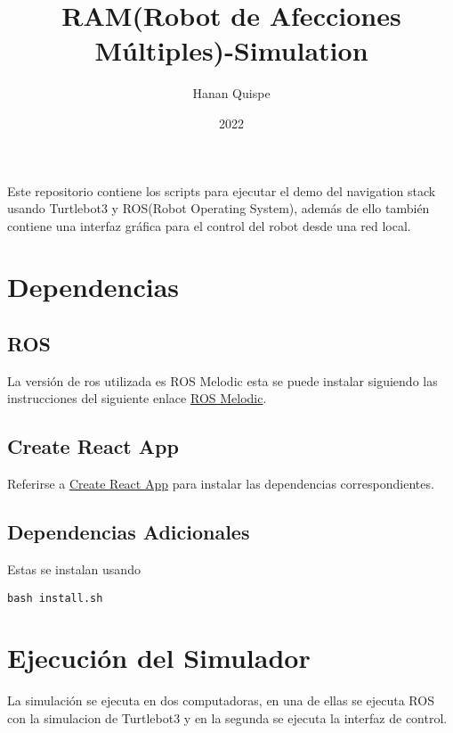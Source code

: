 \documentclass[11pt]{article}
\author{Hanan Quispe}
\date{2022}
\title{RAM(Robot de Afecciones Múltiples)-Simulation}
\begin{document}
\maketitle
Este repositorio contiene los scripts para ejecutar el demo del navigation stack usando Turtlebot3 y ROS(Robot Operating System), además de ello también contiene una interfaz gráfica para el control del robot desde una red local.

\section{Dependencias}
\label{sec:org683f4b4}
\subsection{ROS}
\label{sec:orgad24d42}
La versión de ros utilizada es ROS Melodic esta se puede instalar siguiendo las instrucciones del siguiente enlace \href{http://wiki.ros.org/melodic/Installation/Ubuntu}{ROS Melodic}.
\subsection{Create React App}
\label{sec:orgf81c8e5}
Referirse a \href{https://github.com/facebook/create-react-app}{Create React App} para instalar las dependencias correspondientes.

\subsection{Dependencias Adicionales}
\label{sec:orga8c49e3}
Estas se instalan usando 
\begin{verbatim}
bash install.sh
\end{verbatim}
\section{Ejecución del Simulador}
\label{sec:org6945fc5}
La simulación se ejecuta en dos computadoras, en una de ellas se ejecuta ROS con la simulacion de Turtlebot3 y en la segunda se ejecuta la interfaz de control.
\end{document}
